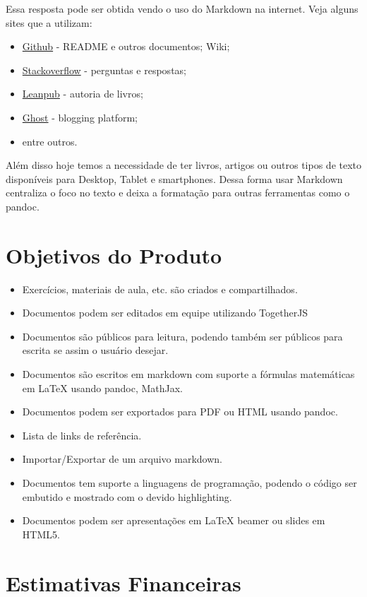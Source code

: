 Essa resposta pode ser obtida vendo o uso do Markdown na internet. Veja
alguns sites que a utilizam:

\begin{itemize}
\item
  \href{http://github.com}{Github} - README e outros documentos; Wiki;
\item
  \href{http://stackoverflow.com/}{Stackoverflow} - perguntas e
  respostas;
\item
  \href{https://leanpub.com/authors\#how\_leanpub\_works}{Leanpub} -
  autoria de livros;
\item
  \href{https://ghost.org/}{Ghost} - blogging platform;
\item
  entre outros.
\end{itemize}
Além disso hoje temos a necessidade de ter livros, artigos ou outros
tipos de texto disponíveis para Desktop, Tablet e smartphones. Dessa
forma usar Markdown centraliza o foco no texto e deixa a formatação para
outras ferramentas como o pandoc.

\section{Objetivos do Produto}

\begin{itemize}
\item
  Exercícios, materiais de aula, etc. são criados e compartilhados.
\item
  Documentos podem ser editados em equipe utilizando TogetherJS
\item
  Documentos são públicos para leitura, podendo também ser públicos para
  escrita se assim o usuário desejar.
\item
  Documentos são escritos em markdown com suporte a fórmulas matemáticas
  em LaTeX usando pandoc, MathJax.
\item
  Documentos podem ser exportados para PDF ou HTML usando pandoc.
\item
  Lista de links de referência.
\item
  Importar/Exportar de um arquivo markdown.
\item
  Documentos tem suporte a linguagens de programação, podendo o código
  ser embutido e mostrado com o devido highlighting.
\item
  Documentos podem ser apresentações em LaTeX beamer ou slides em HTML5.
\end{itemize}
\section{Estimativas Financeiras}

